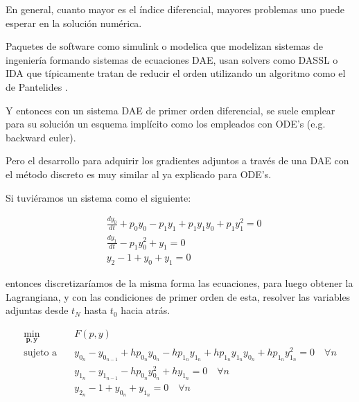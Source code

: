 En general, cuanto mayor es el índice diferencial, mayores problemas uno puede
esperar en la solución numérica.

Paquetes de software como simulink o modelica que modelizan sistemas de
ingeniería formando sistemas de ecuaciones DAE, usan solvers como DASSL
\cite{petzold1982description} o IDA \cite{hindmarsh2005sundials} que
típicamente tratan de reducir el orden utilizando un algoritmo como el de
Pantelides \cite{pantelides1988consistent}.

Y entonces con un sistema DAE de primer orden diferencial, se suele emplear
para su solución un esquema implícito como los empleados con ODE's (e.g.
backward euler).

Pero el desarrollo para adquirir los gradientes adjuntos a través de una DAE
con el método discreto es muy similar al ya explicado para ODE's.

Si tuviéramos un sistema como el siguiente:

\begin{align}
	 & \frac{dy_0}{dt} + p_0 y_0 - p_1 y_1 + p_1 y_1 y_0 + p_1 y_1^2 = 0 \\
	 & \frac{dy_1}{dt} - p_1 y_0^2 + y_1 = 0                             \\
	 & y_2 - 1 + y_0 + y_1 = 0
\end{align}

entonces discretizaríamos de la misma forma las ecuaciones, para luego obtener
la Lagrangiana, y con las condiciones de primer orden de esta, resolver las
variables adjuntas desde $t_N$ hasta $t_0$ hacia atrás.

\begin{align}
	\min_{\mathbf{p}, \mathbf{y}} \quad & F(p, y)                                                                                                                                      \\
	\text{sujeto a} \quad               & y_{0_n} - y_{0_{n-1}} + h  p_{0_n}  y_{0_n} - h  p_{1_n}  y_{1_n} + h  p_{1_n}  y_{1_n}  y_{0_n} + h  p_{1_n}  y_{1_n}^2 = 0 \quad \forall n \\
	                                    & y_{1_n} - y_{1_{n-1}} - h  p_{0_n}  y_{0_n}^2 + h  y_{1_n} = 0 \quad \forall n                                                               \\
	                                    & y_{2_n} - 1 + y_{0_n} + y_{1_n} = 0 \quad \forall n
\end{align}


